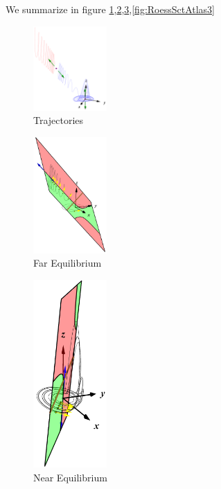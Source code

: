 \documentclass{article}
\begin{document}
We summarize in figure \ref{fig:RoessTrjs2},\ref{fig:RoessFarEq3},\ref{fig:RoessNearEq3},\ref{fig:RoessSctAtlas3}

\begin{figure}
\centering
\includegraphics[width=0.25\textwidth]{RoessTrjs2.png}
\caption{Trajectories}
\label{fig:RoessTrjs2}
\end{figure}

\begin{figure}
\centering
\includegraphics[width=0.25\textwidth]{RoessFarEq3.png}
\caption{Far Equilibrium}
\label{fig:RoessFarEq3}
\end{figure}

\begin{figure}
\centering
\includegraphics[width=0.25\textwidth]{RoessNearEq3.png}
\caption{Near Equilibrium}
\label{fig:RoessNearEq3}
\end{figure}
\end{document}
